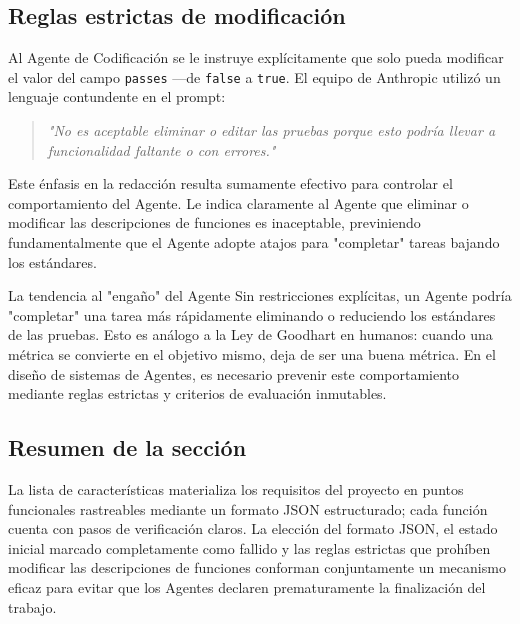 \subsection{Reglas estrictas de modificación}

Al Agente de Codificación se le instruye explícitamente que solo pueda modificar el valor del campo \texttt{passes} —de \texttt{false} a \texttt{true}. El equipo de Anthropic utilizó un lenguaje contundente en el prompt:

\begin{quote}
\textit{"No es aceptable eliminar o editar las pruebas porque esto podría llevar a funcionalidad faltante o con errores."}
\end{quote}

Este énfasis en la redacción resulta sumamente efectivo para controlar el comportamiento del Agente. Le indica claramente al Agente que eliminar o modificar las descripciones de funciones es inaceptable, previniendo fundamentalmente que el Agente adopte atajos para "completar" tareas bajando los estándares.

\begin{warningbox}{La tendencia al "engaño" del Agente}
Sin restricciones explícitas, un Agente podría "completar" una tarea más rápidamente eliminando o reduciendo los estándares de las pruebas. Esto es análogo a la Ley de Goodhart en humanos: cuando una métrica se convierte en el objetivo mismo, deja de ser una buena métrica. En el diseño de sistemas de Agentes, es necesario prevenir este comportamiento mediante reglas estrictas y criterios de evaluación inmutables.
\end{warningbox}

\subsection{Resumen de la sección}

La lista de características materializa los requisitos del proyecto en puntos funcionales rastreables mediante un formato JSON estructurado; cada función cuenta con pasos de verificación claros. La elección del formato JSON, el estado inicial marcado completamente como fallido y las reglas estrictas que prohíben modificar las descripciones de funciones conforman conjuntamente un mecanismo eficaz para evitar que los Agentes declaren prematuramente la finalización del trabajo.

